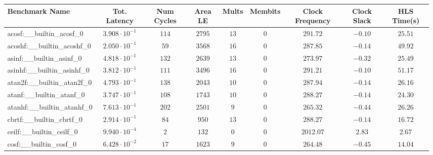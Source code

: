 \begin{tabular}{|l|c|c|c|c|c|c|c|c|}
\hline
Benchmark Name                            & Tot. Latency            & Num Cycles & Area LE   & Mults   & Membits & Clock Frequency & Clock Slack & HLS Time(s) \\
\hline
acosf:\_\_builtin\_acosf\_0               & $ 3.908 \cdot 10^{-1} $ & $ 114    $ & $ 2795  $ & $ 13  $ & $ 0   $ & $ 291.72      $ & $ -0.10   $ & $ 25.51   $ \\
acoshf:\_\_builtin\_acoshf\_0             & $ 2.050 \cdot 10^{-1} $ & $ 59     $ & $ 3568  $ & $ 16  $ & $ 0   $ & $ 287.85      $ & $ -0.14   $ & $ 49.92   $ \\
asinf:\_\_builtin\_asinf\_0               & $ 4.818 \cdot 10^{-1} $ & $ 132    $ & $ 2639  $ & $ 13  $ & $ 0   $ & $ 273.97      $ & $ -0.32   $ & $ 25.49   $ \\
asinhf:\_\_builtin\_asinhf\_0             & $ 3.812 \cdot 10^{-1} $ & $ 111    $ & $ 3496  $ & $ 16  $ & $ 0   $ & $ 291.21      $ & $ -0.10   $ & $ 51.17   $ \\
atan2f:\_\_builtin\_atan2f\_0             & $ 4.793 \cdot 10^{-1} $ & $ 138    $ & $ 2043  $ & $ 10  $ & $ 0   $ & $ 287.94      $ & $ -0.14   $ & $ 26.16   $ \\
atanf:\_\_builtin\_atanf\_0               & $ 3.747 \cdot 10^{-1} $ & $ 108    $ & $ 1743  $ & $ 10  $ & $ 0   $ & $ 288.27      $ & $ -0.14   $ & $ 24.30   $ \\
atanhf:\_\_builtin\_atanhf\_0             & $ 7.613 \cdot 10^{-1} $ & $ 202    $ & $ 2501  $ & $ 9   $ & $ 0   $ & $ 265.32      $ & $ -0.44   $ & $ 26.26   $ \\
cbrtf:\_\_builtin\_cbrtf\_0               & $ 2.914 \cdot 10^{-1} $ & $ 84     $ & $ 950   $ & $ 13  $ & $ 0   $ & $ 288.27      $ & $ -0.14   $ & $ 16.72   $ \\
ceilf:\_\_builtin\_ceilf\_0               & $ 9.940 \cdot 10^{-4} $ & $ 2      $ & $ 132   $ & $ 0   $ & $ 0   $ & $ 2012.07     $ & $ 2.83    $ & $ 2.67    $ \\
cosf:\_\_builtin\_cosf\_0                 & $ 6.428 \cdot 10^{-2} $ & $ 17     $ & $ 1623  $ & $ 9   $ & $ 0   $ & $ 264.48      $ & $ -0.45   $ & $ 14.04   $ \\

\end{tabular}
